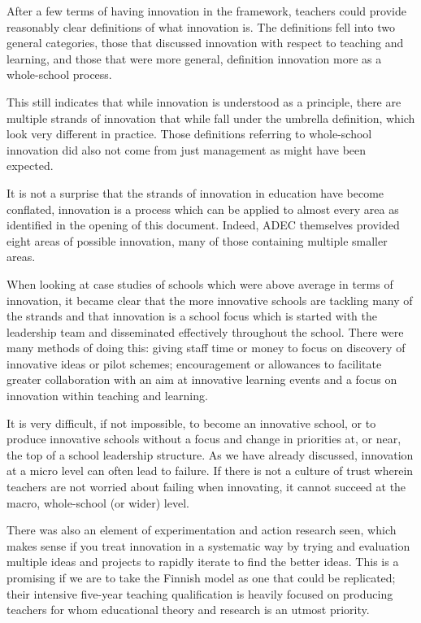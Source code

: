 After a few terms of having innovation in the framework, teachers could provide reasonably clear definitions of what innovation is. The definitions fell into two general categories, those that discussed innovation with respect to teaching and learning, and those that were more general, definition innovation more as a whole-school process.

This still indicates that while innovation is understood as a principle, there are multiple strands of innovation that while fall under the umbrella definition, which look very different in practice. Those definitions referring to whole-school innovation did also not come from just management as might have been expected.

It is not a surprise that the strands of innovation in education have become conflated, innovation is a process which can be applied to almost every area as identified in the opening of this document. Indeed, ADEC themselves provided eight areas of possible innovation, many of those containing multiple smaller areas.

When looking at case studies of schools which were above average in terms of innovation, it became clear that the more innovative schools are tackling many of the strands and that innovation is a school focus which is started with the leadership team and disseminated effectively throughout the school. There were many methods of doing this: giving staff time or money to focus on discovery of innovative ideas or pilot schemes; encouragement or allowances to facilitate greater collaboration with an aim at innovative learning events and a focus on innovation within teaching and learning.

It is very difficult, if not impossible, to become an innovative school, or to produce innovative schools without a focus and change in priorities at, or near, the top of a school leadership structure. As we have already discussed, innovation at a micro level can often lead to failure. If there is not a culture of trust wherein teachers are not worried about failing when innovating, it cannot succeed at the macro, whole-school (or wider) level.

There was also an element of experimentation and action research seen, which makes sense if you treat innovation in a systematic way by trying and evaluation multiple ideas and projects to rapidly iterate to find the better ideas. This is a promising if we are to take the Finnish model as one that could be replicated; their intensive five-year teaching qualification is heavily focused on producing teachers for whom educational theory and research is an utmost priority. 

